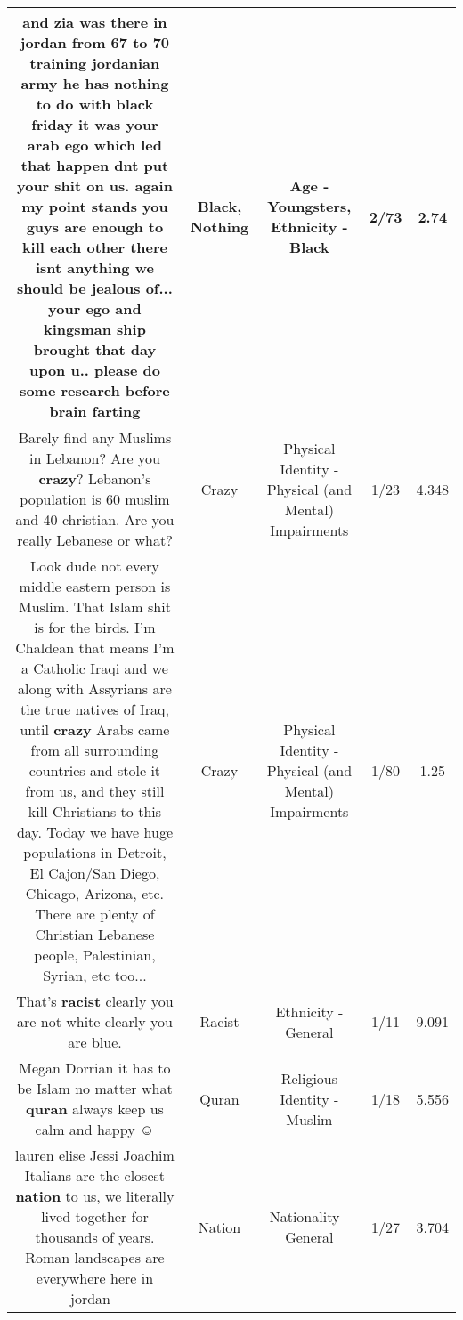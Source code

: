 \documentclass[11pt]{article}
\newlength\mylength
\begin{document}
\begin{center}
\begin{longtable}{|C{.65\mylength}|C{.30\mylength}|C{.12\mylength}|C{.12\mylength}|C{.12\mylength}|}
  \small and zia was there in jordan from 67 to 70 training jordanian army he has \textbf{nothing} to do with \textbf{black} friday it was your arab ego which led that happen dnt put your shit on us. again my point stands you guys are enough to kill each other there isnt anything we should be jealous of... your ego and kingsman ship brought that day upon u.. please do some research before brain farting\normalsize   & Black, Nothing & Age - Youngsters, Ethnicity - Black & 2/73 & 2.74 \\  \hline
  \small Barely find any Muslims in Lebanon? Are you \textbf{crazy}? Lebanon's population is 60 muslim and 40 christian. Are you really Lebanese or what?\normalsize   & Crazy & Physical Identity - Physical (and Mental) Impairments & 1/23 & 4.348 \\  \hline
  \small Look dude not every middle eastern person is Muslim. That Islam shit is for the birds. I'm Chaldean that means I'm a Catholic Iraqi and we along with Assyrians are the true natives of Iraq, until \textbf{crazy} Arabs came from all surrounding countries and stole it from us, and they still kill Christians to this day. Today we have huge populations in Detroit, El Cajon/San Diego, Chicago, Arizona, etc. There are plenty of Christian Lebanese people, Palestinian, Syrian, etc too...\normalsize   & Crazy & Physical Identity - Physical (and Mental) Impairments & 1/80 & 1.25 \\  \hline
  \small That's \textbf{racist} clearly you are not white clearly you are blue.\normalsize   & Racist & Ethnicity - General & 1/11 & 9.091 \\  \hline
  \small Megan Dorrian it has to be Islam no matter what \textbf{quran} always keep us calm and happy ☺\normalsize   & Quran & Religious Identity - Muslim & 1/18 & 5.556 \\  \hline
  \small lauren elise Jessi Joachim Italians are the closest \textbf{nation} to us, we literally lived together for thousands of years. Roman landscapes are everywhere here in jordan 🤗\normalsize   & Nation & Nationality - General & 1/27 & 3.704 \\  \hline

\end{longtable}
\end{center}
\end{document}
